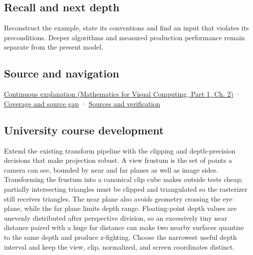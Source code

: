 \subsection{Recall and next depth}\label{appendix-1c07d64f5e70-recall-and-next-depth}

\hypertarget{appendix-1c07d64f5e70-recall-and-next-depth}{}

Reconstruct the example, state its conventions and find an input that violates its preconditions. Deeper algorithms and measured production performance remain separate from the present model.

\subsection{Source and navigation}\label{appendix-1c07d64f5e70-source-and-navigation}

\hypertarget{appendix-1c07d64f5e70-source-and-navigation}{}

\href{../02-Mathematics-for-Visual-Computing-P01/main.pdf\#nameddest=01-foundations-i-ch018-keep-the-promises-visible-while-moving-between-representations}{Continuous explanation (Mathematics for Visual Computing, Part 1, Ch. 2)} · \hyperref[appendix-fd090d982a15-phase-7---parts-601-700]{Coverage and source gap} · \hyperref[appendix-a103e7846d21-phase-7---source-analysis-and-verification]{Sources and verification}

\subsection{University course development}\label{appendix-1c07d64f5e70-university-course-development}

\hypertarget{appendix-1c07d64f5e70-university-course-development}{}

Extend the existing transform pipeline with the clipping and depth-precision decisions that make projection robust. A view frustum is the set of points a camera can see, bounded by near and far planes as well as image sides. Transforming the frustum into a canonical clip cube makes outside tests cheap; partially intersecting triangles must be clipped and triangulated so the rasterizer still receives triangles. The near plane also avoids geometry crossing the eye plane, while the far plane limits depth range. Floating-point depth values are unevenly distributed after perspective division, so an excessively tiny near distance paired with a huge far distance can make two nearby surfaces quantize to the same depth and produce z-fighting. Choose the narrowest useful depth interval and keep the view, clip, normalized, and screen coordinates distinct.

